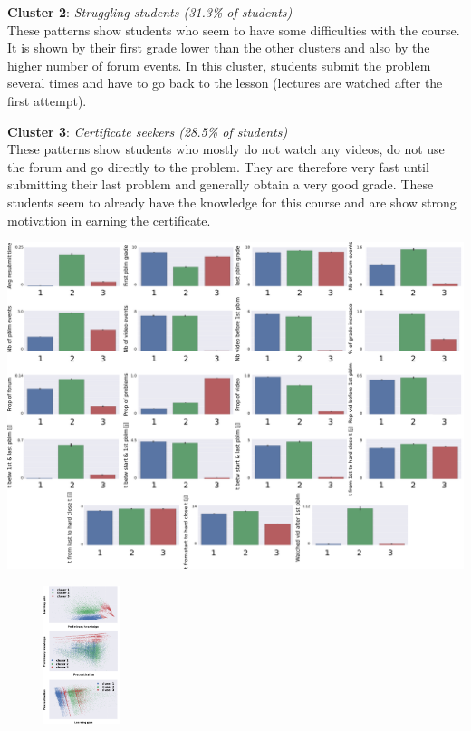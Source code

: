 \documentclass[a0,portrait]{a0poster}
\begin{document}
\begin{minipage}[c]{\linewidth}
\begin{framed}
\begin{multicols}{2}
\textbf{Cluster 2}: \textit{Struggling students (31.3\% of students)} \\
These patterns show students who seem to have some difficulties with the course. It is shown by their first grade lower than the other clusters and also by the higher number of forum events. In this cluster, students submit the problem several times and have to go back to the lesson (lectures are watched after the first attempt).

\textbf{Cluster 3}: \textit{Certificate seekers (28.5\% of students)} \\
These patterns show students who mostly do not watch any videos, do not use the forum and go directly to the problem. They are therefore very fast until submitting their last problem and generally obtain a very good grade. These students seem to already have the knowledge for this course and are show strong motivation in earning the certificate. \\

\begin{center}
\includegraphics[width=0.95\linewidth]{figures/KMEAN_features}
\label{fig:kmeans}
\end{center}
\vspace{0.1cm}

\begin{figure}
\begin{center}
\includegraphics[width=0.2\textwidth]{figures/PCA}
\end{center}
\end{figure}


\end{multicols}
\end{framed}
\end{minipage}
\end{document}
